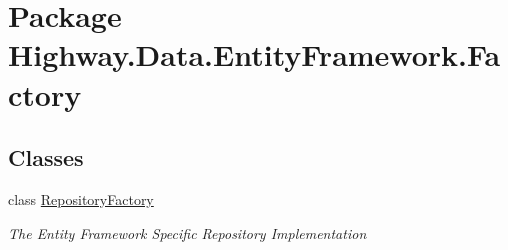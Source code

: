 \hypertarget{namespace_highway_1_1_data_1_1_entity_framework_1_1_factory}{\section{Package Highway.\-Data.\-Entity\-Framework.\-Factory}
\label{namespace_highway_1_1_data_1_1_entity_framework_1_1_factory}
}
\subsection*{Classes}
\begin{DoxyCompactItemize}
\item 
class \hyperlink{class_highway_1_1_data_1_1_entity_framework_1_1_factory_1_1_repository_factory}{Repository\-Factory}
\begin{DoxyCompactList}\small\item\em The Entity Framework Specific Repository Implementation \end{DoxyCompactList}\end{DoxyCompactItemize}

